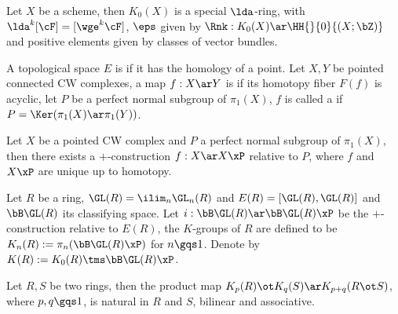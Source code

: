 \documentclass[article, a4paper, twoside]{universal}
\begin{document}
\begin{thm}
    Let $X$ be a scheme, then $K_{0}(X)$ is a special $\lda$-ring, with $\lda^{k}[\cF]=[\wge^{k}\cF]$, $\eps$ given by $\Rnk:K_{0}(X)\ar\HH{}{0}{(X;\bZ)}$ and positive elements given by classes of vector bundles.
\end{thm}



\begin{dfn}
    A topological space $E$ is  if it has the homology of a point. Let $X,Y$ be pointed connected CW complexes, a map $f:X\ar Y$ is  if its homotopy fiber $F(f)$ is acyclic, let $P$ be a perfect normal subgroup of $\pi_{1}(X)$, $f$ is called a  if $P=\Ker(\pi_{1}(X)\ar\pi_{1}(Y))$.
\end{dfn}

\begin{thm}
    Let $X$ be a pointed CW complex and $P$ a perfect normal subgroup of $\pi_{1}(X)$, then there exists a $+$-construction $f:X\ar X\xP$ relative to $P$, where $f$ and $X\xP$ are unique up to homotopy.
\end{thm}

\begin{dfn}
    Let $R$ be a ring, $\GL(R)=\ilim_{n}\GL_{n}(R)$ and $E(R)=[\GL(R),\GL(R)]$ and $\bB\GL(R)$ its classifying space. Let $i:\bB\GL(R)\ar\bB\GL(R)\xP$ be the $+$-construction relative to $E(R)$, the $K$-groups of $R$ are defined to be $K_{n}(R):=\pi_{n}(\bB\GL(R)\xP)$ for $n\gqs1$. Denote by $K(R):=K_{0}(R)\tms\bB\GL(R)\xP$.
\end{dfn}

\begin{thm}
    Let $R,S$ be two rings, then the product map $K_{p}(R)\ot K_{q}(S)\ar K_{p+q}(R\ot S)$, where $p,q\gqs1$, is natural in $R$ and $S$, bilinear and associative.
\end{thm}
\end{document}
